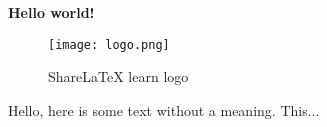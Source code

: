 \documentclass[../rapportdestage.tex]{subfiles}
\begin{document}
\textbf{Hello world!}
 
\begin{figure}[bh]
\centering
\texttt{[image: logo.png]} 
 
\label{fig:img1}
\caption{ShareLaTeX learn logo}
\end{figure}
 
Hello, here is some text without a meaning.  This... 
\end{document}
